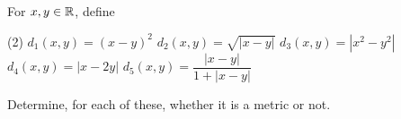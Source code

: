 For $x,y \in \mathbb{R}$, define

\begin{tasks}(2)
	\task $d_1(x,y) = (x-y)^2$
	\task $d_2(x,y) = \sqrt{|x - y|}$
	\task $d_3(x,y) = |x^2 - y^2|$
	\task $d_4(x,y) = |x - 2y|$
	\task $d_5(x,y) = \dfrac{|x - y|}{1 + |x - y|}$
\end{tasks}

Determine, for each of these, whether it is a metric or not.